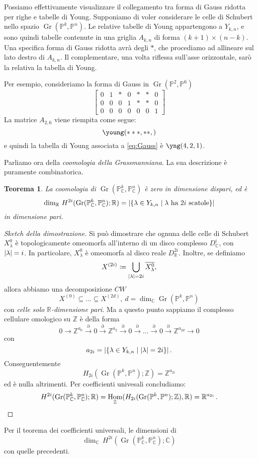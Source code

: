 \documentclass[a4paper, 11pt]{article}
\theoremstyle{definition}
\theoremstyle{plain}
\newtheorem{Teo}[Def]{Teorema}
\DeclarePairedDelimiter{\abs}{\lvert}{\rvert}
\newcommand{\PP}{\mathbb{P}}
\newcommand{\R}{\mathbb{R}}
\newcommand{\C}{\mathbb{C}}
\newcommand{\Z}{\mathbb{Z}}
\newcommand{\deff}{\coloneqq}
\DeclareMathOperator{\Hom}{Hom}
\DeclareMathOperator{\Gr}{Gr}
\begin{document}
Possiamo effettivamente visualizzare il collegamento tra forma di Gauss ridotta per righe e tabelle di Young. Supponiamo di voler considerare le celle di Schubert nello spazio $\Gr(\PP^k, \PP^n)$. Le relative tabelle di Young appartengono a $Y_{k,n}$, e sono quindi tabelle contenute in una griglia $A_{k,n}$ di forma $(k+1)\times (n-k)$. Una specifica forma di Gauss ridotta avrà degli $*$, che procediamo ad allineare sul lato destro di $A_{k,n}$. Il complementare, una volta riflessa sull'asse orizzontale, sarò la relativa la tabella di Young. 

Per esempio, consideriamo la forma di Gauss in $\Gr(\PP^2, \PP^6)$
\[
	\begin{bmatrix}
		0 & 1 & * & 0 & * & * & 0 \\
		0 & 0 & 0 & 1 & * & * & 0 \\
		0 & 0 & 0 & 0 & 0 & 0 & 1
	\end{bmatrix}	
\]
La matrice $A_{2,6}$ viene riempita come segue:
\begin{equation}\label{eq:Gauss}
	\young(\hfil ***,\hfil\hfil **,\hfil\hfil\hfil\hfil)
\end{equation}
e quindi la tabella di Young associata a \eqref{eq:Gauss} è {\tiny$ \yng(4,2,1)$.\vspace{1ex}}

Parliamo ora della \emph{coomologia della Grassmanniana}. La sua descrizione è puramente combinatorica.
\begin{Teo}
	La coomologia di $\Gr(\PP^k_\C, \PP^n_\C)$ è zero in dimensione dispari, ed è
	\[
		\dim_\R\,H^{2i}(\Gr(\PP^k_\C, \PP^n_\C); \R) = \abs{\{\lambda \in Y_{k,n}\mid \lambda \text{ ha $2i$ scatole}\}}
	\]
	in dimensione pari.
\end{Teo}
\begin{proof}[Sketch della dimostrazione]
	Si può dimostrare che ognuna delle celle di Schubert $X^0_\lambda$ è topologicamente omeomorfa all'interno di un disco complesso $D_\C^i$, con $\abs{\lambda} = i$. In particolare, $X^0_\lambda$ è omeomorfa al disco reale $D_\R^{2i}$. Inoltre, se definiamo
	\[
		X^{(2i)} \deff \bigcup_{\abs{\lambda} = 2i} \overline{X^0_\lambda},
	\]
	allora abbiamo una decomposizione $CW$
	\[	
		X^{(0)} \subseteq \dots \subseteq X^{(2d)},\ d = \dim_\C \Gr(\PP^k, \PP^n)
	\]
	con \emph{celle solo $\R$-dimensione pari}. Ma a questo punto sappiamo il complesso cellulare omologico su $\Z$ è della forma
	\[
		0 \to \Z^{a_0} \overset{\partial}{\to} 0 \overset{\partial}{\to} \Z^{a_2} \overset{\partial}{\to} 0 \overset{\partial}{\to} \dots \overset{\partial}{\to} 0 \overset{\partial}{\to} \Z^{a_{2d}} \to 0 
	\]
	con 
	\[
		a_{2i} = \abs{\{\lambda \in Y_{k,n} \mid \abs{\lambda} = 2i\}}\,.
	\]
	Conseguentemente 
	\[
		H_{2i}(\Gr(\PP^k, \PP^n);\Z) = \Z^{a_{2i}}
	\]
	ed è nulla altrimenti. Per coefficienti univesali concludiamo:
	\[
		H^{2i}(\Gr(\PP^k_\C, \PP^n_\C); \R) = \Hom_\Z(H_{2i}(\Gr(\PP^k, \PP^n);\Z),\R) = \R^{a_{2i}}\,. \qedhere
	\]
\end{proof}
Per il teorema dei coefficienti universali, le dimensioni di 
\[
	\dim_\C\,H^{2i}(\Gr(\PP^k_\C, \PP^n_\C); \C)
\]
con quelle precedenti.
\end{document}
